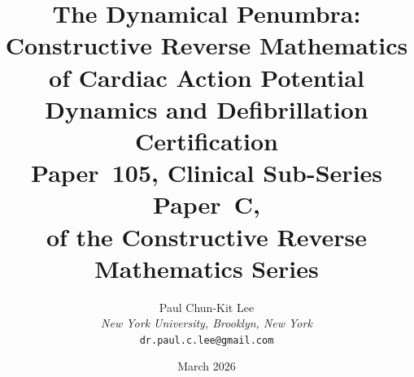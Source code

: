 \documentclass[11pt,a4paper]{article}
\theoremstyle{plain}
\theoremstyle{definition}
\begin{document}
\title{\textbf{The Dynamical Penumbra:\\
Constructive Reverse Mathematics of Cardiac Action Potential\\
Dynamics and Defibrillation Certification}\\[6pt]
\large Paper~105, Clinical Sub-Series Paper~C,\\
of the Constructive Reverse Mathematics Series}

\author{Paul Chun-Kit Lee\\
\textit{New York University, Brooklyn, New York}\\
\texttt{dr.paul.c.lee@gmail.com}}

\date{March 2026}
\maketitle
\end{document}
